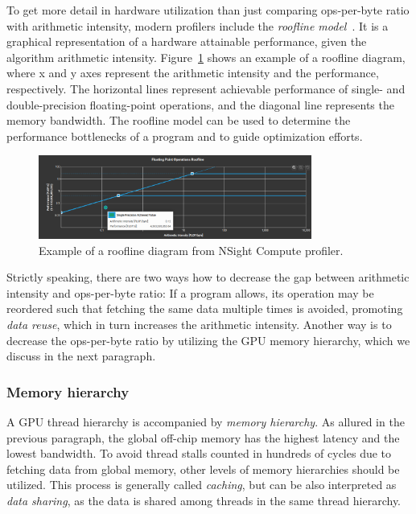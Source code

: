 To get more detail in hardware utilization than just comparing ops-per-byte ratio with arithmetic intensity, modern profilers include the \emph{roofline model}~\cite{williams2009roofline}. It is a graphical representation of a hardware attainable performance, given the algorithm arithmetic intensity. Figure~\ref{fig:roof} shows an example of a roofline diagram, where x and y axes represent the arithmetic intensity and the performance, respectively. The horizontal lines represent achievable performance of single- and double-precision floating-point operations, and the diagonal line represents the memory bandwidth. The roofline model can be used to determine the performance bottlenecks of a program and to guide optimization efforts. 

\begin{figure}
    \centering
    \includegraphics[width=0.8\textwidth]{img/roofline.png}
    \caption{Example of a roofline diagram from NSight Compute profiler.}
    \label{fig:roof}
\end{figure}

Strictly speaking, there are two ways how to decrease the gap between arithmetic intensity and ops-per-byte ratio: If a program allows, its operation may be reordered such that fetching the same data multiple times is avoided, promoting \emph{data reuse}, which in turn increases the arithmetic intensity. Another way is to decrease the ops-per-byte ratio by utilizing the GPU memory hierarchy, which we discuss in the next paragraph.  

\subsubsection{Memory hierarchy}
\label{sec:memory_hier}

A GPU thread hierarchy is accompanied by \emph{memory hierarchy}. As allured in the previous paragraph, the global off-chip memory has the highest latency and the lowest bandwidth. To avoid thread stalls counted in hundreds of cycles due to fetching data from global memory, other levels of memory hierarchies should be utilized. This process is generally called \emph{caching}, but can be also interpreted as \emph{data sharing}, as the data is shared among threads in the same thread hierarchy. 

